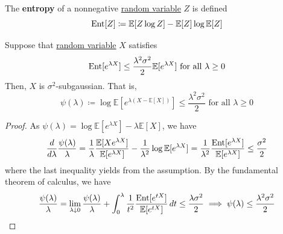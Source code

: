   \begin{definition}[Entropy]
    \label{def:entropy}
  The \textbf{entropy} of a nonnegative \hyperref[prob-def:random-variable]{random variable} $Z$ is defined 
  \begin{equation}
    \operatorname{Ent}[Z] \coloneqq \mathbb{E}[Z \log Z] - \mathbb{E}[Z] \log \mathbb{E}[Z]
  \end{equation}
  \end{definition}

  \begin{lemma}[Herbst]
    \label{thm:herbst}
  Suppose that \hyperref[prob-def:random-variable]{random variable} $X$ satisfies
  \begin{equation}
    \operatorname{Ent}[e^{\lambda X}] \leq \frac{\lambda^2 \sigma^2}{2} \mathbb{E}[e^{\lambda X}]  \text{ for all } \lambda \geq 0
  \end{equation}
  Then, $X$ is $\sigma^2$-subgaussian. That is, 
  \begin{equation}
    \psi(\lambda) \coloneqq \log\mathbb{E}[e^{\lambda (X - \mathbb{E}[X])}] \leq \frac{\lambda^2 \sigma^2}{2} \text{ for all } \lambda \geq 0
  \end{equation}
  \end{lemma}
  \begin{proof}
  As $\psi(\lambda) = \log\mathbb{E}[ e^{\lambda X}] - \lambda \mathbb{E}[X]$, we have 
  \begin{equation}
    \frac{d}{d \lambda} \frac{\psi(\lambda)}{\lambda} = \frac{1}{\lambda} \frac{\mathbb{E}[X e^{\lambda X}]}{\mathbb{E}[e^{\lambda X}]} - \frac{1}{\lambda^2} \log \mathbb{E}[e^{\lambda X}] = \frac{1}{\lambda^2} \frac{\operatorname{Ent} [e^{\lambda X}]}{\mathbb{E}[e^{\lambda X}]} \leq \frac{\sigma^2}{2}
  \end{equation}
  where the last inequality yields from the assumption. By the fundamental theorem of calculus, we have 
  \begin{equation}
    \frac{\psi (\lambda)}{\lambda} = \lim_{\lambda \downarrow 0} \frac{\psi(\lambda)}{\lambda} + \int_0^\lambda \frac{1}{t^2} \frac{\operatorname{Ent}[e^{t X}]}{\mathbb{E}[e^{t X}]} \,dt \leq \frac{\lambda \sigma^2}{2} \implies \psi(\lambda) \leq \frac{\lambda^2 \sigma^2}{2}
  \end{equation}
  \end{proof}


